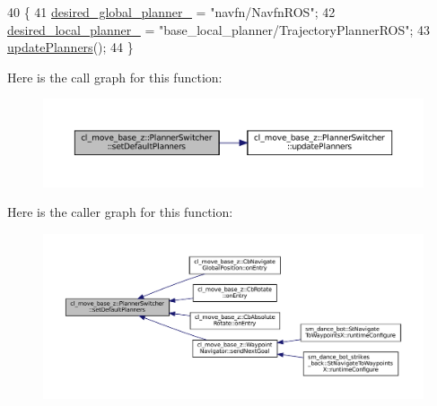 \begin{DoxyCode}
40 \{
41   \hyperlink{classcl__move__base__z_1_1PlannerSwitcher_aef047d3778b2993c1df146bbad43e03d}{desired\_global\_planner\_} = \textcolor{stringliteral}{"navfn/NavfnROS"};
42   \hyperlink{classcl__move__base__z_1_1PlannerSwitcher_a6cbf65f11bb69125f913caaabdf7b4cf}{desired\_local\_planner\_} = \textcolor{stringliteral}{"base\_local\_planner/TrajectoryPlannerROS"};
43   \hyperlink{classcl__move__base__z_1_1PlannerSwitcher_a146641f63aea3185daab4c5cbb789550}{updatePlanners}();
44 \}
\end{DoxyCode}
Here is the call graph for this function\+:
\nopagebreak
\begin{figure}[H]
\begin{center}
\leavevmode
\includegraphics[width=350pt]{classcl__move__base__z_1_1PlannerSwitcher_ad3f0d08a51af6218d203bf44a7f9df40_cgraph}
\end{center}
\end{figure}
Here is the caller graph for this function\+:
\nopagebreak
\begin{figure}[H]
\begin{center}
\leavevmode
\includegraphics[width=350pt]{classcl__move__base__z_1_1PlannerSwitcher_ad3f0d08a51af6218d203bf44a7f9df40_icgraph}
\end{center}
\end{figure}
\mbox{\label{classcl__move__base__z_1_1PlannerSwitcher_a4bec9859c90f125f9fcc2b68594caf17}} 
